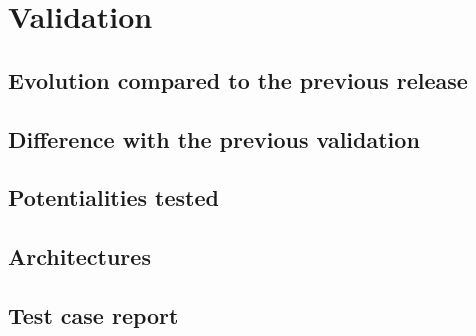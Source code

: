 \section{Validation}
%
\subsection{Evolution compared to the previous release}

\subsection{Difference with the previous validation}

\subsection{Potentialities tested}


\subsection{Architectures}

\subsection{Test case report}
